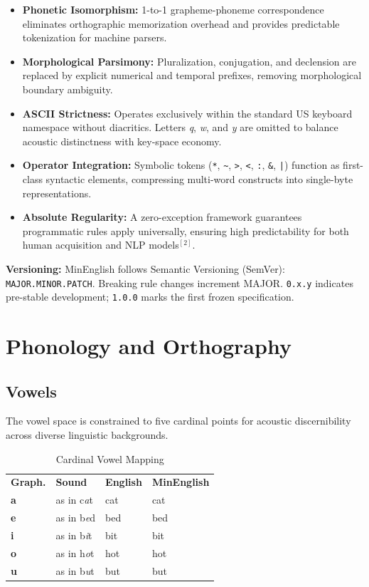 \documentclass[12pt,onecolumn,letterpaper]{article}
\newcommand{\me}[1]{\texttt{#1}}
\newcommand{\MEtablelayout}{%
\footnotesize
\setlength{\tabcolsep}{6pt}%
\renewcommand{\arraystretch}{1.12}%
\arrayrulecolor{MERule}%
}
\begin{document}
\begin{itemize}[leftmargin=*]
    \item \textbf{Phonetic Isomorphism:} 1-to-1 grapheme-phoneme correspondence eliminates orthographic memorization overhead and provides predictable tokenization for machine parsers.
    \item \textbf{Morphological Parsimony:} Pluralization, conjugation, and declension are replaced by explicit numerical and temporal prefixes, removing morphological boundary ambiguity.
    \item \textbf{ASCII Strictness:} Operates exclusively within the standard US keyboard namespace without diacritics. Letters \textit{q}, \textit{w}, and \textit{y} are omitted to balance acoustic distinctness with key-space economy.
    \item \textbf{Operator Integration:} Symbolic tokens (\me{*}, \me{\~{}}, \me{>}, \me{<}, \me{:}, \me{\&}, \me{|}) function as first-class syntactic elements, compressing multi-word constructs into single-byte representations.
    \item \textbf{Absolute Regularity:} A zero-exception framework guarantees programmatic rules apply universally, ensuring high predictability for both human acquisition and NLP models$^{[2]}$.
\end{itemize}

\textbf{Versioning:} MinEnglish follows Semantic Versioning (SemVer):
\texttt{MAJOR.MINOR.PATCH}. Breaking rule changes increment MAJOR.
\texttt{0.x.y} indicates pre-stable development; \texttt{1.0.0} marks the
first frozen specification.

\section{Phonology and Orthography}

\subsection{Vowels}
The vowel space is constrained to five cardinal points for acoustic
discernibility across diverse linguistic backgrounds.

\begin{table}[h!]
\centering
\MEtablelayout
\begin{tabularx}{\linewidth}{lllX}
\rowcolor{MEGray}
\textbf{Graph.} & \textbf{Sound} & \textbf{English} & \textbf{MinEnglish} \\
\textbf{a} & as in c\textit{a}t & cat & cat \\
\textbf{e} & as in b\textit{e}d & bed & bed \\
\textbf{i} & as in b\textit{i}t & bit & bit \\
\textbf{o} & as in h\textit{o}t & hot & hot \\
\textbf{u} & as in b\textit{u}t & but & but \\
\bottomrule
\end{tabularx}
\caption{Cardinal Vowel Mapping}
\end{table}
\end{document}
